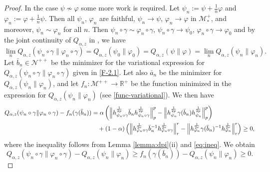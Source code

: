 \documentclass[12pt]{article}
\theoremstyle{definition}
\theoremstyle{remark}
\numberwithin{equation}{section}
\def\Me{\mathcal M}
\def\Ne{\mathcal N}
\def\ffi{\varphi}
\begin{document}
\begin{proof}
In the case $\psi\not\sim \ffi$ some more work is required. Let $\psi_n:=\psi+\frac1n \ffi$ and
$\ffi_n:=\ffi+\frac1n \psi$. Then all $\psi_n$, $\ffi_n$ are faithful,  $\psi_n\to \psi$, $\ffi_n\to \ffi$ in
$\Me_*^+$, and moreover,  $\psi_n\sim \ffi_n$ for all $n$. Then
$\psi_n\circ\gamma\sim \ffi_n\circ\gamma$, $\psi_n\circ\gamma\to \psi_0$,
$\ffi_n \circ \gamma\to \ffi_0$ and by the joint continuity of $Q_{\alpha,z}$ in
\cite[Theorem 1(iv)]{kato2023onrenyi}, we have
\[
\lim_n
Q_{\alpha,z}(\psi_n\circ\gamma\|\ffi_n\circ\gamma)=Q_{\alpha,z}(\psi_0\|\ffi_0)
=Q_{\alpha,z}(\psi\|\ffi)=\lim_nQ_{\alpha,z}(\psi_n\|\ffi_n).
\]
Let $\bar b_{n}\in \Ne^{++}$ be the minimizer for the variational expression for
$Q_{\alpha,z}(\psi_n\circ\gamma\|\ffi_n\circ\gamma)$ {given in \eqref{F-2.1}.}
Let also $\bar a_n$ be the minimizer for $Q_{\alpha,z}(\psi_n\|\ffi_n)$, and let
$f_n:\Me^{++}\to \mathbb R^+$ be the function minimized in the expression for
$Q_{\alpha,z}(\psi_n\|\ffi_n)$ (see \eqref{func-variational}). We then have 
\begin{align*}
Q_{\alpha,z}(\psi_n\circ\gamma\|\ffi_n\circ\gamma)-f_n(\gamma(\bar
b_{n}))&=\alpha\left(\Big\|h_{\psi_n\circ\gamma}^{\frac1{2p}}\bar b_{n}
h_{\psi_n\circ\gamma}^{\frac1{2p}}\Big\|_p^p-\Big\|h_{\psi_n}^{1\over 2p}\gamma(\bar
b_n)h_{\psi_n}^{1\over 2p}\Big\|_p^p\right)\\
&\quad + (1-\alpha)\left(\Big\|h_{\ffi_n\circ\gamma}^{\frac1{2r}}\bar b_{n}^{-1}
h_{\ffi_n\circ\gamma}^{\frac1{2r}}\Big\|_r^r-\Big\|h_{\ffi_n}^{1\over 2r}\gamma(\bar
b_n)^{-1}h_{\ffi_n}^{1\over 2r}\Big\|_r^r\right)\ge 0,
\end{align*}
where the inequality follows from Lemma \ref{lemma:dpi}(ii) and \eqref{eq:ineq}. We
obtain
\begin{equation}\label{eq:qfn}
Q_{\alpha,z}(\psi_n\circ\gamma\|\ffi_n\circ\gamma)-Q_{\alpha,z}(\psi_n\|\ffi_n)\ge f_n(\gamma(\bar
b_{n}))-Q_{\alpha,z}(\psi_n\|\ffi_n)\ge 0.
\end{equation}


\end{proof}
\end{document}
